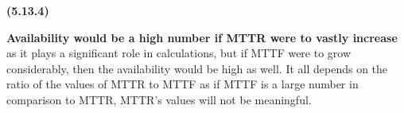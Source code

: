 \documentclass[11pt]{article}
\renewcommand\part[1]{\vspace{.10in}\textbf{(#1)}\par}
\begin{document}
	\part{5.13.4}
		\textbf{Availability would be a high number if MTTR were to vastly increase} as it plays a significant role in calculations, but if MTTF were to grow considerably, then the availability would be high as well. It all depends on the ratio of the values of MTTR to MTTF as if MTTF is a large number in comparison to MTTR, MTTR's values will not be meaningful.\par
\end{document}
